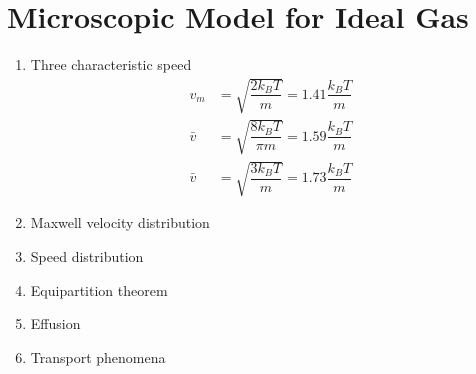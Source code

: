 \documentclass[10.5pt, a4paper, oneside]{article}
\numberwithin{equation}{section}%
\begin{document}
\section{Microscopic Model for Ideal Gas}
\begin{multicols}{2}
	\begin{enumerate}
		\item Three characteristic speed
			\begin{align}
				v_m &= \sqrt{\dfrac{2k_BT}{m}}=1.41\dfrac{k_BT}{m}
				\\
				\bar{v} &= \sqrt{\dfrac{8k_BT}{\pi m}}=1.59\dfrac{k_BT}{m}
				\\
				\bar{v} &= \sqrt{\dfrac{3k_BT}{m}}=1.73\dfrac{k_BT}{m}
			\end{align}
		\item Maxwell velocity distribution
		\item Speed distribution
		\item Equipartition theorem
		\item Effusion
		\item Transport phenomena
	\end{enumerate}
\end{multicols}
\end{document}
